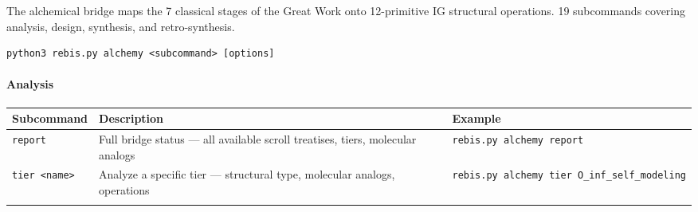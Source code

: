 The alchemical bridge maps the 7 classical stages of the Great Work onto
12-primitive IG structural operations. 19 subcommands covering analysis,
design, synthesis, and retro-synthesis.

\begin{verbatim}
python3 rebis.py alchemy <subcommand> [options]
\end{verbatim}

\hypertarget{analysis}{%
\paragraph{Analysis}\label{analysis}}

\begin{longtable}[]{@{}lll@{}}
\toprule
\begin{minipage}[b]{0.32\columnwidth}\raggedright
Subcommand\strut
\end{minipage} & \begin{minipage}[b]{0.35\columnwidth}\raggedright
Description\strut
\end{minipage} & \begin{minipage}[b]{0.24\columnwidth}\raggedright
Example\strut
\end{minipage}\tabularnewline
\midrule
\endhead
\begin{minipage}[t]{0.32\columnwidth}\raggedright
\texttt{report}\strut
\end{minipage} & \begin{minipage}[t]{0.35\columnwidth}\raggedright
Full bridge status --- all available scroll treatises, tiers, molecular
analogs\strut
\end{minipage} & \begin{minipage}[t]{0.24\columnwidth}\raggedright
\texttt{rebis.py\ alchemy\ report}\strut
\end{minipage}\tabularnewline
\begin{minipage}[t]{0.32\columnwidth}\raggedright
\texttt{tier\ \textless{}name\textgreater{}}\strut
\end{minipage} & \begin{minipage}[t]{0.35\columnwidth}\raggedright
Analyze a specific tier --- structural type, molecular analogs,
operations\strut
\end{minipage} & \begin{minipage}[t]{0.24\columnwidth}\raggedright
\texttt{rebis.py\ alchemy\ tier\ O\_inf\_self\_modeling}\strut
\end{minipage}\tabularnewline
\begin{minipage}[t]{0.32\columnwidth}\raggedright

\end{minipage}
\end{longtable}
